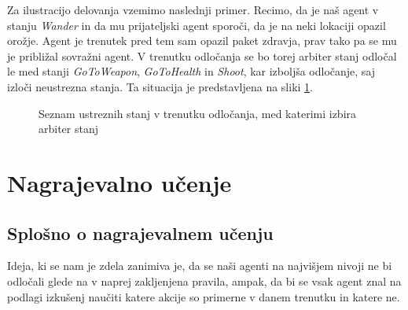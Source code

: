 \documentclass[a4paper,10pt]{article}
\begin{document}
Za ilustracijo delovanja vzemimo naslednji primer. Recimo, da je naš agent v stanju \textit{Wander} in da mu prijateljski agent sporoči, da je na neki lokaciji opazil orožje. Agent je trenutek pred tem sam opazil paket zdravja, prav tako pa se mu je približal sovražni agent. V trenutku odločanja se bo torej arbiter stanj odločal le med stanji \textit{GoToWeapon}, \textit{GoToHealth} in \textit{Shoot}, kar izboljša odločanje, saj izloči neustrezna stanja. Ta situacija je predstavljena na sliki \ref{fig:eligible-set-example}. 

\begin{figure}[h]
  \centering
  \caption{Seznam ustreznih stanj v trenutku odločanja, med katerimi izbira arbiter stanj}
  \label{fig:eligible-set-example}
\end{figure}

\section{Nagrajevalno učenje} \label{sec:nagrajevalno-ucenje}
\subsection{Splošno o nagrajevalnem učenju}
Ideja, ki se nam je zdela zanimiva je, da se naši agenti na najvišjem nivoji ne bi odločali glede na v naprej zakljenjena pravila, ampak, da bi se vsak agent znal
na podlagi izkušenj naučiti katere akcije so primerne v danem trenutku in katere ne. 
\end{document}
